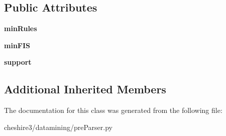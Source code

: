 \subsection*{Public Attributes}
\begin{DoxyCompactItemize}
\item 
\hypertarget{classcheshire3_1_1datamining_1_1pre_parser_1_1_magic_fimi1_pre_parser_a73c8b82ea6511fe83a2ba016a76e06fa}{{\bfseries min\-Rules}}\label{classcheshire3_1_1datamining_1_1pre_parser_1_1_magic_fimi1_pre_parser_a73c8b82ea6511fe83a2ba016a76e06fa}

\item 
\hypertarget{classcheshire3_1_1datamining_1_1pre_parser_1_1_magic_fimi1_pre_parser_a66e7fb5bd04e0e65062f425fed380fa3}{{\bfseries min\-F\-I\-S}}\label{classcheshire3_1_1datamining_1_1pre_parser_1_1_magic_fimi1_pre_parser_a66e7fb5bd04e0e65062f425fed380fa3}

\item 
\hypertarget{classcheshire3_1_1datamining_1_1pre_parser_1_1_magic_fimi1_pre_parser_a00ef7498cfc9b658c291a53e77b17e1d}{{\bfseries support}}\label{classcheshire3_1_1datamining_1_1pre_parser_1_1_magic_fimi1_pre_parser_a00ef7498cfc9b658c291a53e77b17e1d}

\end{DoxyCompactItemize}
\subsection*{Additional Inherited Members}


The documentation for this class was generated from the following file\-:\begin{DoxyCompactItemize}
\item 
cheshire3/datamining/pre\-Parser.\-py\end{DoxyCompactItemize}
